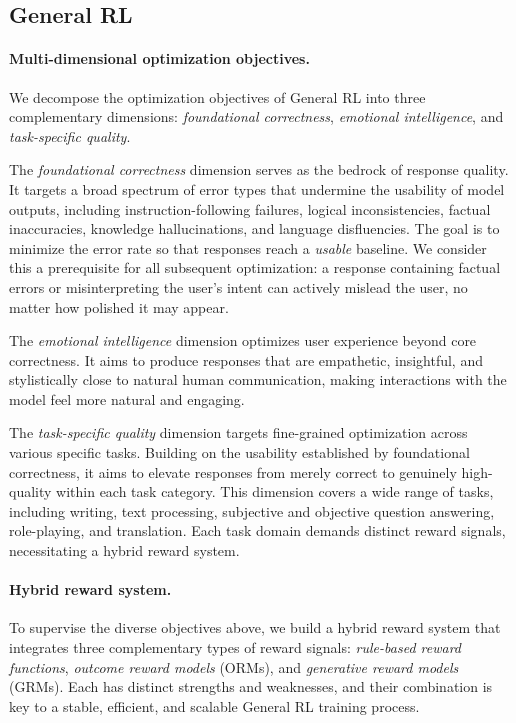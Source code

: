 \documentclass{article}
\theoremstyle{definition}
\begin{document}
\subsection{General RL}

\paragraph{Multi-dimensional optimization objectives.}
We decompose the optimization objectives of General RL into three complementary dimensions: \emph{foundational correctness}, \emph{emotional intelligence}, and \emph{task-specific quality}.

The \emph{foundational correctness} dimension serves as the bedrock of response quality. It targets a broad spectrum of error types that undermine the usability of model outputs, including instruction-following failures, logical inconsistencies, factual inaccuracies, knowledge hallucinations, and language disfluencies. The goal is to minimize the error rate so that responses reach a \emph{usable} baseline. We consider this a prerequisite for all subsequent optimization: a response containing factual errors or misinterpreting the user's intent can actively mislead the user, no matter how polished it may appear.

The \emph{emotional intelligence} dimension optimizes user experience beyond core correctness. It aims to produce responses that are empathetic, insightful, and stylistically close to natural human communication, making interactions with the model feel more natural and engaging.

The \emph{task-specific quality} dimension targets fine-grained optimization across various specific tasks. Building on the usability established by foundational correctness, it aims to elevate responses from merely correct to genuinely high-quality within each task category. This dimension covers a wide range of tasks, including writing, text processing, subjective and objective question answering, role-playing, and translation. Each task domain demands distinct reward signals, necessitating a hybrid reward system.

\paragraph{Hybrid reward system.}
To supervise the diverse objectives above, we build a hybrid reward system that integrates three complementary types of reward signals: \emph{rule-based reward functions}, \emph{outcome reward models} (ORMs), and \emph{generative reward models} (GRMs). Each has distinct strengths and weaknesses, and their combination is key to a stable, efficient, and scalable General RL training process.
\end{document}
